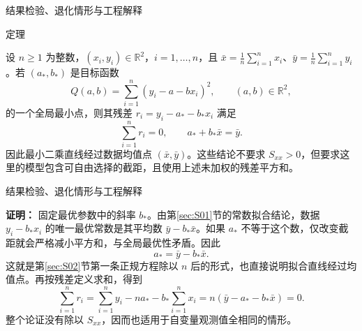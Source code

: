 \documentclass[aspectratio=169,10pt,fontset=fandol]{ctexbeamer}
\begin{document}
\begin{frame}[t,fragile]{结果检验、退化情形与工程解释}
\footnotesize
\begin{block}{定理}
{\footnotesize
设 $n\geq1$ 为整数，$(x_i,y_i)\in\mathbb{R}^2$，$i=1,\ldots,n$，且 $\bar{x}=\frac1n\sum_{i=1}^{n}x_i$、$\bar{y}=\frac1n\sum_{i=1}^{n}y_i$。若 $(a_*,b_*)$ 是目标函数
\[
Q(a,b)=\sum_{i=1}^{n}(y_i-a-bx_i)^2,\qquad (a,b)\in\mathbb{R}^2,
\]
的一个全局最小点，则其残差 $r_i=y_i-a_*-b_*x_i$ 满足
\[
\sum_{i=1}^{n}r_i=0,\qquad a_*+b_*\bar{x}=\bar{y}.
\]
因此最小二乘直线经过数据均值点 $(\bar{x},\bar{y})$。这些结论不要求 $S_{xx}>0$，但要求这里的模型包含可自由选择的截距，且使用上述未加权的残差平方和。

}
\end{block}
\end{frame}
\begin{frame}[t,fragile]{结果检验、退化情形与工程解释}
\footnotesize
{\footnotesize
\textbf{证明：}
固定最优参数中的斜率 $b_*$。由第\ref{sec:S01}节的常数拟合结论，数据 $y_i-b_*x_i$ 的唯一最优常数是其平均数 $\bar{y}-b_*\bar{x}$。如果 $a_*$ 不等于这个数，仅改变截距就会严格减小平方和，与全局最优性矛盾。因此
\[
a_* =\bar{y}-b_*\bar{x}.
\]
这就是第\ref{sec:S02}节第一条正规方程除以 $n$ 后的形式，也直接说明拟合直线经过均值点。再按残差定义求和，得到
\[
\sum_{i=1}^{n}r_i
=\sum_{i=1}^{n}y_i-na_*-b_*\sum_{i=1}^{n}x_i
=n(\bar{y}-a_*-b_*\bar{x})=0.
\]
整个论证没有除以 $S_{xx}$，因而也适用于自变量观测值全相同的情形。

}
\end{frame}
\end{document}
